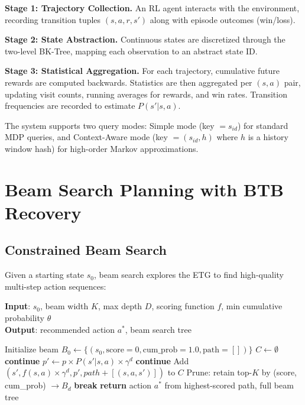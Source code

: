 \documentclass[letterpaper]{article}
\begin{document}
\textbf{Stage 1: Trajectory Collection.} An RL agent interacts with the environment, recording transition tuples $(s, a, r, s')$ along with episode outcomes (win/loss).

\textbf{Stage 2: State Abstraction.} Continuous states are discretized through the two-level BK-Tree, mapping each observation to an abstract state ID.

\textbf{Stage 3: Statistical Aggregation.} For each trajectory, cumulative future rewards are computed backwards. Statistics are then aggregated per $(s, a)$ pair, updating visit counts, running averages for rewards, and win rates. Transition frequencies are recorded to estimate $P(s'|s,a)$.

The system supports two query modes: Simple mode (key $= s_{id}$) for standard MDP queries, and Context-Aware mode (key $= (s_{id}, h)$ where $h$ is a history window hash) for high-order Markov approximations.


\section{Beam Search Planning with BTB Recovery}
\label{sec:planning}

\subsection{Constrained Beam Search}

Given a starting state $s_0$, beam search explores the ETG to find high-quality multi-step action sequences:

\begin{algorithm}[t]
	\caption{Beam Search on ETG}
	\label{alg:beam}
	\textbf{Input}: $s_0$, beam width $K$, max depth $D$, scoring function $f$, min cumulative probability $\theta$ \\
	\textbf{Output}: recommended action $a^*$, beam search tree
	\begin{algorithmic}[1]
		\STATE Initialize beam $B_0 \leftarrow \{(s_0, \text{score}=0, \text{cum\_prob}=1.0, \text{path}=[])\}$
		\STATE $C \leftarrow \emptyset$ 
		\STATE \textbf{continue}
		\ENDIF
		\STATE $p' \leftarrow p \times P(s'|s,a) \times \gamma^d$
		\STATE \textbf{continue}
		\ENDIF
		\STATE Add $(s', f(s,a) \times \gamma^d, p', path + [(s,a,s')])$ to $C$
		\ENDFOR
		\ENDFOR
		\ENDFOR
		\STATE Prune: retain top-$K$ by (score, cum\_prob) $\rightarrow B_d$
		\STATE \textbf{break}
		\ENDIF
		\ENDFOR
		\STATE \textbf{return} action $a^*$ from highest-scored path, full beam tree
	\end{algorithmic}
\end{algorithm}
\end{document}
